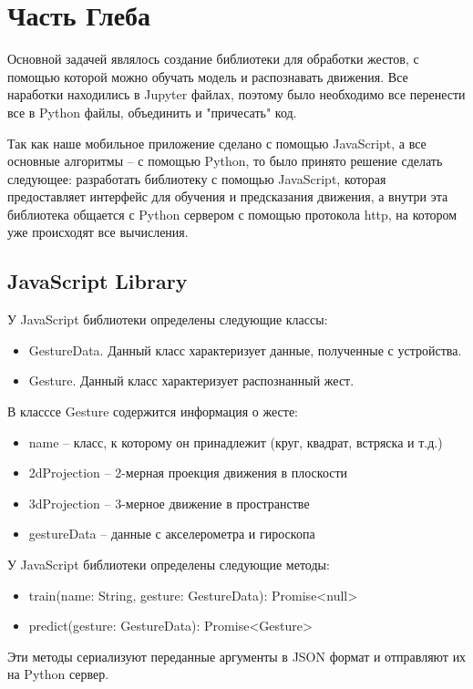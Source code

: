 \section{Часть Глеба}

Основной задачей являлось создание библиотеки для обработки жестов, с помощью которой можно обучать модель и распознавать движения. Все наработки находились в Jupyter файлах, поэтому было необходимо все перенести все в Python файлы, объединить и "причесать" код. \newline

Так как наше мобильное приложение сделано с помощью JavaScript, а все основные алгоритмы – с помощью Python, то было принято решение сделать следующее: разработать библиотеку с помощью JavaScript, которая предоставляет интерфейс для обучения и предсказания движения, а внутри эта библиотека общается с Python сервером с помощью протокола http, на котором уже происходят все вычисления.

\subsection{JavaScript Library}
У JavaScript библиотеки определены следующие классы:
\begin{itemize}
  \item GestureData. Данный класс характеризует данные, полученные с устройства.
  \item Gesture. Данный класс характеризует распознанный жест.
\end{itemize}
В класссе Gesture содержится информация о жесте:
\begin{itemize}
  \item name -- класс, к которому он принадлежит (круг, квадрат, встряска и т.д.)
  \item 2dProjection -- 2-мерная проекция движения в плоскости
  \item 3dProjection -- 3-мерное движение в пространстве
  \item gestureData -- данные с акселерометра и гироскопа
\end{itemize}

У JavaScript библиотеки определены следующие методы:
\begin{itemize}
  \item train(name: String, gesture: GestureData): Promise<null> {} 
  \item predict(gesture: GestureData): Promise<Gesture> {}
\end{itemize}
Эти методы сериализуют переданные аргументы в JSON формат и отправляют их на Python сервер.


